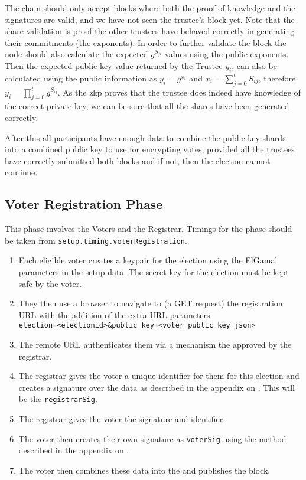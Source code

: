 The chain should only accept blocks where both the proof of knowledge and the signatures are valid, and we have not seen the trustee's block yet. Note that the share validation is proof the other trustees have behaved correctly in generating their commitments (the exponents). In order to further validate the block the node should also calculate the expected $g^{S_{ji}}$ values using the public exponents. Then the expected public key value returned by the Trustee $y_i$, can also be calculated using the public information as $y_i = g^{x_i}$ and $x_i = \sum\limits_{j=0}^{t} S_{ij}$, therefore $y_i = \prod\limits_{j=0}^{t} g^{S_{ij}}$. As the \gls{zkp} proves that the trustee does indeed have knowledge of the correct private key, we can be sure that all the shares have been generated correctly.

After this all participants have enough data to combine the public key shards into a combined public key to use for encrypting votes, provided all the trustees have correctly submitted both blocks and if not, then the election cannot continue.

\subsection{Voter Registration Phase}
\label{ch:astris:detail:registration}

This phase involves the Voters and the Registrar. Timings for the phase should be taken from \texttt{setup.timing.voterRegistration}.

\begin{enumerate}
    \item Each eligible voter creates a keypair for the election using the ElGamal parameters in the setup data. The secret key for the election must be kept safe by the voter.
    \item They then use a browser to navigate to (a GET request) the registration URL with the addition of the extra URL parameters:\\ \verb|election=<electionid>&public_key=<voter_public_key_json>|
    \item The remote URL authenticates them via a mechanism the approved by the registrar.
    \item The registrar gives the voter a unique identifier for them for this election and creates a signature over the data as described in the appendix on . This will be the \texttt{registrarSig}.
    \item The registrar gives the voter the signature and identifier.
    \item The voter then creates their own signature as \texttt{voterSig} using the method described in the appendix on .
    \item The voter then combines these data into the  and publishes the block.
\end{enumerate}

